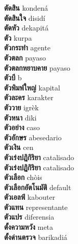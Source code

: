 \textbf{ ตัดสิน  } kondená \\
\textbf{ ตัดสินใจ  } disidí \\
\textbf{ ตัดหัว  } dekapitá \\
\textbf{ ตัว  } kurpa \\
\textbf{ ตัวกระทำ  } agente \\
\textbf{ ตัวตลก  } payaso \\
\textbf{ ตัวตลกหยาบคาย  } payaso \\
\textbf{ ตัวบี  } b \\
\textbf{ ตัวพิมพ์ใหญ่  } kapital \\
\textbf{ ตัวละคร  } karakter \\
\textbf{ ตัววาย  } igrèk \\
\textbf{ ตัวหนา  } diki \\
\textbf{ ตัวอย่าง  } caso \\
\textbf{ ตัวอักษร  } abesedario \\
\textbf{ ตัวเงิน  } cen \\
\textbf{ ตัวเร่งปฎิกิริยา  } catalisado \\
\textbf{ ตัวเร่งปฏิกิริยา  } catalisado \\
\textbf{ ตัวเลือก  } chòis \\
\textbf{ ตัวเลือกอัตโนมัติ  } default \\
\textbf{ ตัวเอลฟ์  } kabouter \\
\textbf{ ตัวแทน  } representante \\
\textbf{ ตัวแปร  } diferensia \\
\textbf{ ตั้งความหวัง  } meta \\
\textbf{ ตั้งด่านตรวจ  } barikadiá \\
